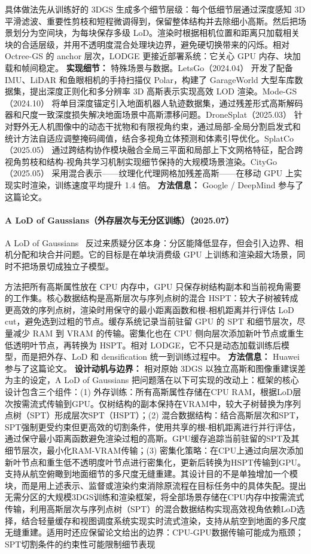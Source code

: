 具体做法先从训练好的 3DGS 生成多个细节层级：每个低细节层通过深度感知 3D 平滑滤波、重要性剪枝和短程微调得到，保留整体结构并去除细小高斯。然后把场景划分为空间块，为每块保存多级 LoD。渲染时根据相机位置和距离只加载相关块的合适层级，并用不透明度混合处理块边界，避免硬切换带来的闪烁。相对 Octree-GS 的 anchor 层次，LODGE 更接近部署系统：它关心 GPU 内存、块加载和帧间稳定。
\textbf{实现细节：} 特殊场景与数据。LetsGo（2024.04） 开发了配备 IMU、LiDAR 和鱼眼相机的手持扫描仪 Polar，构建了 GarageWorld 大型车库数据集，提出深度正则化和多分辨率 3D 高斯表示实现高效 LOD 渲染。Mode-GS（2024.10） 将单目深度锚定引入地面机器人轨迹数据集，通过残差形式高斯解码器和尺度一致深度损失解决地面场景中高斯漂移问题。DroneSplat（2025.03） 针对野外无人机图像中的动态干扰物和有限视角约束，通过局部-全局分割启发式和统计方法自适应调整掩码阈值，结合多视角立体预测和体素引导优化。SplatCo（2025.05） 通过跨结构协作模块融合全局三平面和局部上下文网格特征，配合跨视角剪枝和结构-视角共学习机制实现细节保持的大规模场景渲染。CityGo（2025.05） 采用混合表示——纹理化代理网格加残差高斯——在移动 GPU 上实现实时渲染，训练速度平均提升 1.4 倍。
\textbf{方法信息：} Google / DeepMind 参与了这篇论文。
\paragraph{A LoD of Gaussians（外存层次与无分区训练）（2025.07）}
A LoD of Gaussians~\cite{2507_01110} 反过来质疑分区本身：分区能降低显存，但会引入边界、相机分配和块合并问题。它的目标是在单块消费级 GPU 上训练和渲染超大场景，同时不把场景切成独立子模型。

方法把所有高斯属性放在 CPU 内存中，GPU 只保存树结构副本和当前视角需要的工作集。核心数据结构是高斯层次与序列点树的混合 HSPT：较大子树被转成更高效的序列点树，渲染时用保守的最小距离函数和根-相机距离并行评估 LoD cut，避免选到过粗的节点。缓存系统记录当前驻留 GPU 的 SPT 和细节层次，尽量减少 RAM 到 VRAM 的传输。密集化也在 CPU 侧向层次添加新叶节点或重生低透明叶节点，再转换为 HSPT。相对 LODGE，它不只是动态加载训练后模型，而是把外存、LoD 和 densification 统一到训练过程中。
\textbf{方法信息：} Huawei 参与了这篇论文。
\textbf{设计动机与边界：} 相对原始 3DGS 以独立高斯和图像重建误差为主的设定，A LoD of Gaussians 把问题落在以下可实现的改动上：框架的核心设计包含三个组件：(1) 外存训练：所有高斯属性存储在CPU RAM，根据LoD层次按需流式传输到GPU。仅树结构的副本保持在VRAM中，较大子树替换为序列点树（SPT）形成层次SPT（HSPT）；(2) 混合数据结构：结合高斯层次和SPT，SPT强制更受约束但更高效的切割条件，使用共享的根-相机距离进行并行评估，通过保守最小距离函数避免渲染过粗的高斯。GPU缓存追踪当前驻留的SPT及其细节层次，最小化RAM-VRAM传输；(3) 密集化策略：在CPU上通过向层次添加新叶节点和重生低不透明度叶节点进行密集化，更新后转换为HSPT传输到GPU。支持从航空俯瞰到地面细节的多尺度无缝重建。其设计目的不是单独增加一个模块，而是用上述表示、监督或渲染约束消除原流程在目标任务中的具体失配。提出无需分区的大规模3DGS训练和渲染框架，将全部场景存储在CPU内存中按需流式传输，利用高斯层次与序列点树（SPT）的混合数据结构实现高效视角依赖LoD选择，结合轻量缓存和视图调度系统实现实时流式渲染，支持从航空到地面的多尺度无缝重建。适用时还应保留论文给出的边界：CPU-GPU数据传输可能成为瓶颈；SPT切割条件的约束性可能限制细节表现
